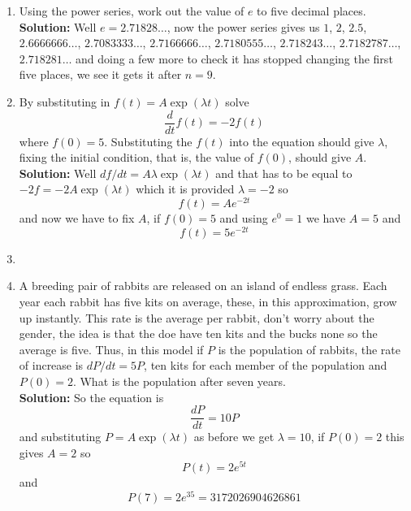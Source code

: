 \documentclass[12pt]{article}
\begin{document}
\begin{enumerate}
\item Using the power series, work out the value of $e$ to five decimal places.\\
\textbf{Solution: } Well $e=2.71828\ldots$, now the power series gives us $1$, $2$, $2.5$, $2.6666666\ldots$, $2.7083333\ldots$, $2.7166666\ldots$, $2.7180555\ldots$, $2.718243\ldots$, $2.7182787\ldots$, $2.718281\ldots$ and doing a few more to check it has stopped changing the first five places, we see it gets it after $n=9$.


\item By substituting in $f(t)=A\exp(\lambda t)$ solve 
\begin{equation}
\frac{d}{dt}f(t)=-2f(t)
\end{equation}
where $f(0)=5$. Substituting the $f(t)$ into the equation should give $\lambda$, fixing the initial condition, that is, the value of $f(0)$, should give $A$.\\
\textbf{Solution: } Well $df/dt=A\lambda \exp(\lambda t)$ and that has to be equal to $-2f=-2A\exp(\lambda t)$ which it is provided $\lambda=-2$ so
\begin{equation}
f(t)=Ae^{-2t}
\end{equation}
and now we have to fix $A$, if $f(0)=5$ and using $e^0=1$ we have $A=5$ and
\begin{equation}
f(t)=5e^{-2t}
\end{equation}


\item 
\item A breeding pair of rabbits are released on an island of endless
  grass. Each year each rabbit has five kits on average, these, in this
  approximation, grow up instantly. This rate is the average per rabbit,
  don't worry about the gender, the idea is that the doe have ten
  kits and the bucks none so the average is five. Thus, in this model
  if $P$ is the population of rabbits, the rate of increase is
  $dP/dt=5P$, ten kits for each member of the population and
  $P(0)=2$. What is the population after seven years.\\
\textbf{Solution: } So the equation is 
 \begin{equation}
\frac{dP}{dt}=10P
\end{equation}
and substituting $P=A\exp(\lambda t)$ as before we get $\lambda =10$,
if $P(0)=2$ this gives $A=2$ so
\begin{equation}
P(t)=2e^{5t}
\end{equation}
and 
\begin{equation}
P(7)=2e^{35}=3172026904626861
\end{equation}


\end{enumerate}
\end{document}
